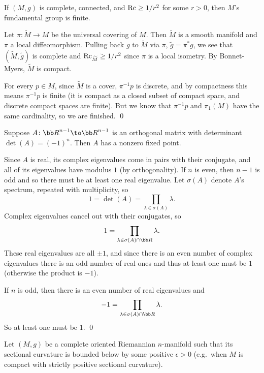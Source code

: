\eproof

\bcoro

    If $(M,g)$ is complete, connected, and ${\rm Rc}\geq1/r^2$ for some $r>0$, then $M$'s fundamental group is finite.

\ecoro

\bproof

    Let $\pi\colon\tilde M\to M$ be the universal covering of $M$.
    Then $\tilde M$ is a smooth manifold and $\pi$ a local diffeomorphism.
    Pulling back $g$ to $\tilde M$ via $\pi$, $\tilde g=\pi^*g$, we see that $(\tilde M,\tilde g)$ is complete and
    ${\rm Rc}_{\widetilde M}\geq1/r^2$ since $\pi$ is a local isometry.
    By Bonnet-Myers, $\tilde M$ is compact.

    For every $p\in M$, since $\tilde M$ is a cover, $\pi^{-1}p$ is discrete, and by compactness this means $\pi^{-1}p$
    is finite (it is compact as a closed subset of compact space, and discrete compact spaces are finite).
    But we know that $\pi^{-1}p$ and $\pi_1(M)$ have the same cardinality, so we are finished.
    \qed

\eproof

\blemm

    Suppose $A\colon\bR^{n-1}\to\bR^{n-1}$ is an orthogonal matrix with determinant $\det(A)=(-1)^n$.
    Then $A$ has a nonzero fixed point.

\elemm

\bproof

    Since $A$ is real, its complex eigenvalues come in pairs with their conjugate, and all of its eigenvalues have
    modulus $1$ (by orthogonality).
    If $n$ is even, then $n-1$ is odd and so there must be at least one real eigenvalue.
    Let $\sigma(A)$ denote $A$'s spectrum, repeated with multiplicity, so
    $$ 1 = \det(A) = \prod_{\lambda\in\sigma(A)}\lambda . $$
    Complex eigenvalues cancel out with their conjugates, so
    $$ 1 = \prod_{\lambda\in\sigma(A)\cap\bR}\lambda . $$
    These real eigenvalues are all $\pm1$, and since there is an even number of complex eigenvalues there is an odd
    number of real ones and thus at least one must be $1$ (otherwise the product is $-1$).

    If $n$ is odd, then there is an even number of real eigenvalues and
    $$ -1 = \prod_{\lambda\in\sigma(A)\cap\bR}\lambda . $$
    So at least one must be $1$.
    \qed

\eproof

\bthrm[title={Synge-Weinstein}]

    Let $(M,g)$ be a complete oriented Riemannian $n$-manifold such that its sectional curvature is bounded below
    by some positive $\epsilon>0$ (e.g.\ when $M$ is compact with strictly positive sectional curvature).

